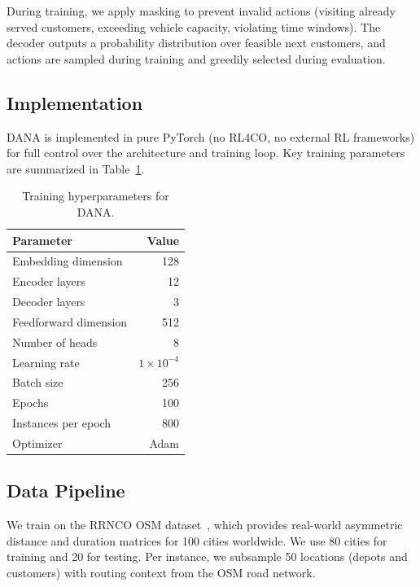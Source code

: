 \documentclass[12pt,a4paper]{article}
\begin{document}
During training, we apply masking to prevent invalid actions (visiting already
served customers, exceeding vehicle capacity, violating time windows). The
decoder outputs a probability distribution over feasible next customers, and
actions are sampled during training and greedily selected during evaluation.

\subsection{Implementation}

DANA is implemented in pure PyTorch (no RL4CO, no external RL frameworks) for
full control over the architecture and training loop. Key training parameters
are summarized in Table~\ref{tab:training}.

\begin{table}[ht]
	\centering
	\begin{tabular}{lr}
		\toprule
		Parameter             & Value              \\
		\midrule
		Embedding dimension   & 128                \\
		Encoder layers        & 12                 \\
		Decoder layers        & 3                  \\
		Feedforward dimension & 512                \\
		Number of heads       & 8                  \\
		Learning rate         & $1 \times 10^{-4}$ \\
		Batch size            & 256                \\
		Epochs                & 100                \\
		Instances per epoch   & 800                \\
		Optimizer             & Adam               \\
		\bottomrule
	\end{tabular}
	\caption{Training hyperparameters for DANA.}
	\label{tab:training}
\end{table}

\subsection{Data Pipeline}

We train on the RRNCO OSM dataset~\cite{rrnco2026}, which provides real-world
asymmetric distance and duration matrices for 100 cities worldwide. We use 80
cities for training and 20 for testing. Per instance, we subsample 50 locations
(depots and customers) with routing context from the OSM road network.
\end{document}
